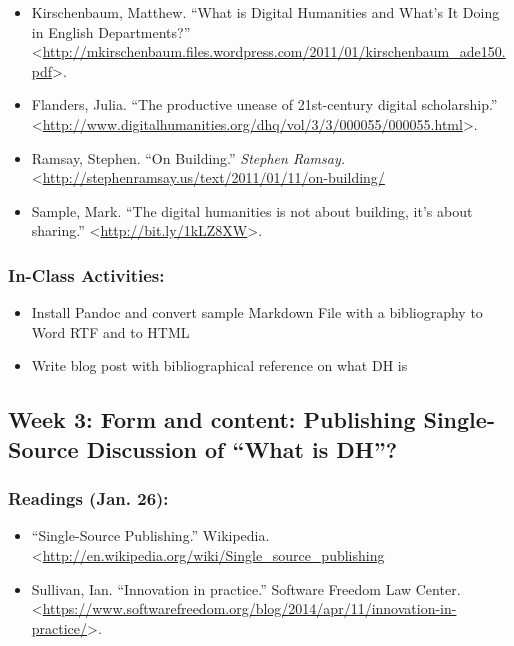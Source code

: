 \documentclass[]{article}
\begin{document}
\begin{itemize}
\itemsep1pt\parskip0pt
\item
  Kirschenbaum, Matthew. ``What is Digital Humanities and What's It
  Doing in English Departments?''
  \textless{}\url{http://mkirschenbaum.files.wordpress.com/2011/01/kirschenbaum_ade150.pdf}\textgreater{}.
\item
  Flanders, Julia. ``The productive unease of 21st-century digital
  scholarship.''
  \textless{}\url{http://www.digitalhumanities.org/dhq/vol/3/3/000055/000055.html}\textgreater{}.
\item
  Ramsay, Stephen. ``On Building.'' \emph{Stephen Ramsay.}
  \textless{}\url{http://stephenramsay.us/text/2011/01/11/on-building/}
\item
  Sample, Mark. ``The digital humanities is not about building, it's
  about sharing.'' \textless{}\url{http://bit.ly/1kLZ8XW}\textgreater{}.
\end{itemize}

\subsubsection{In-Class Activities:}\label{in-class-activities}

\begin{itemize}
\itemsep1pt\parskip0pt
\item
  Install Pandoc and convert sample Markdown File with a bibliography to
  Word RTF and to HTML
\item
  Write blog post with bibliographical reference on what DH is
\end{itemize}

\subsection{Week 3: Form and content: Publishing Single-Source
Discussion of ``What is
DH''?}\label{week-3-form-and-content-publishing-single-source-discussion-of-what-is-dh}

\subsubsection{Readings (Jan. 26):}\label{readings-jan.-26}

\begin{itemize}
\itemsep1pt\parskip0pt
\item
  ``Single-Source Publishing.'' Wikipedia.
  \textless{}\url{http://en.wikipedia.org/wiki/Single_source_publishing}
\item
  Sullivan, Ian. ``Innovation in practice.'' Software Freedom Law
  Center.
  \textless{}\url{https://www.softwarefreedom.org/blog/2014/apr/11/innovation-in-practice/}\textgreater{}.
\end{itemize}
\end{document}
